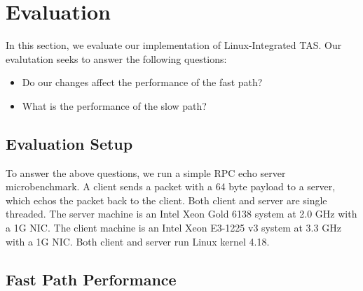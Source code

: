 \section{Evaluation}\label{Eval}

In this section, we evaluate our implementation of Linux-Integrated TAS. Our
evalutation seeks to answer the following questions:

\begin{itemize}
    \item Do our changes affect the performance of the fast path?
    \item What is the performance of the slow path?
\end{itemize}

\subsection{Evaluation Setup}

To answer the above questions, we run a simple RPC echo server microbenchmark. A  
client sends a packet with a 64 byte payload to a server, which echos the packet
back to the client. Both client and server are single threaded. The server 
machine is an Intel Xeon Gold 6138 system at 2.0 GHz with a 1G NIC. The client 
machine is an Intel Xeon E3-1225 v3 system at 3.3 GHz with a 1G NIC. Both client 
and server run Linux kernel 4.18.

\subsection{Fast Path Performance}

